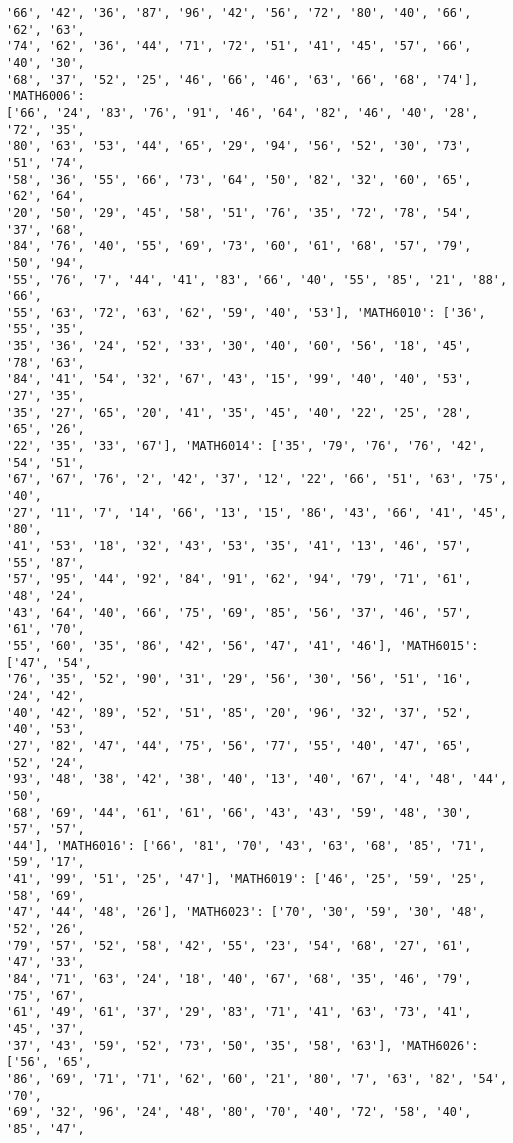 \documentclass[11pt]{article}
\begin{document}
\begin{Verbatim}[commandchars=\\\{\}]
'66', '42', '36', '87', '96', '42', '56', '72', '80', '40', '66', '62', '63',
'74', '62', '36', '44', '71', '72', '51', '41', '45', '57', '66', '40', '30',
'68', '37', '52', '25', '46', '66', '46', '63', '66', '68', '74'], 'MATH6006':
['66', '24', '83', '76', '91', '46', '64', '82', '46', '40', '28', '72', '35',
'80', '63', '53', '44', '65', '29', '94', '56', '52', '30', '73', '51', '74',
'58', '36', '55', '66', '73', '64', '50', '82', '32', '60', '65', '62', '64',
'20', '50', '29', '45', '58', '51', '76', '35', '72', '78', '54', '37', '68',
'84', '76', '40', '55', '69', '73', '60', '61', '68', '57', '79', '50', '94',
'55', '76', '7', '44', '41', '83', '66', '40', '55', '85', '21', '88', '66',
'55', '63', '72', '63', '62', '59', '40', '53'], 'MATH6010': ['36', '55', '35',
'35', '36', '24', '52', '33', '30', '40', '60', '56', '18', '45', '78', '63',
'84', '41', '54', '32', '67', '43', '15', '99', '40', '40', '53', '27', '35',
'35', '27', '65', '20', '41', '35', '45', '40', '22', '25', '28', '65', '26',
'22', '35', '33', '67'], 'MATH6014': ['35', '79', '76', '76', '42', '54', '51',
'67', '67', '76', '2', '42', '37', '12', '22', '66', '51', '63', '75', '40',
'27', '11', '7', '14', '66', '13', '15', '86', '43', '66', '41', '45', '80',
'41', '53', '18', '32', '43', '53', '35', '41', '13', '46', '57', '55', '87',
'57', '95', '44', '92', '84', '91', '62', '94', '79', '71', '61', '48', '24',
'43', '64', '40', '66', '75', '69', '85', '56', '37', '46', '57', '61', '70',
'55', '60', '35', '86', '42', '56', '47', '41', '46'], 'MATH6015': ['47', '54',
'76', '35', '52', '90', '31', '29', '56', '30', '56', '51', '16', '24', '42',
'40', '42', '89', '52', '51', '85', '20', '96', '32', '37', '52', '40', '53',
'27', '82', '47', '44', '75', '56', '77', '55', '40', '47', '65', '52', '24',
'93', '48', '38', '42', '38', '40', '13', '40', '67', '4', '48', '44', '50',
'68', '69', '44', '61', '61', '66', '43', '43', '59', '48', '30', '57', '57',
'44'], 'MATH6016': ['66', '81', '70', '43', '63', '68', '85', '71', '59', '17',
'41', '99', '51', '25', '47'], 'MATH6019': ['46', '25', '59', '25', '58', '69',
'47', '44', '48', '26'], 'MATH6023': ['70', '30', '59', '30', '48', '52', '26',
'79', '57', '52', '58', '42', '55', '23', '54', '68', '27', '61', '47', '33',
'84', '71', '63', '24', '18', '40', '67', '68', '35', '46', '79', '75', '67',
'61', '49', '61', '37', '29', '83', '71', '41', '63', '73', '41', '45', '37',
'37', '43', '59', '52', '73', '50', '35', '58', '63'], 'MATH6026': ['56', '65',
'86', '69', '71', '71', '62', '60', '21', '80', '7', '63', '82', '54', '70',
'69', '32', '96', '24', '48', '80', '70', '40', '72', '58', '40', '85', '47',

\end{Verbatim}
\end{document}
